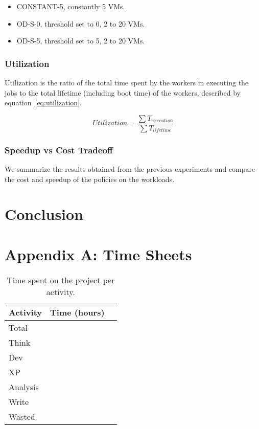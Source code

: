 \documentclass[a4paper]{IEEEtran}
\begin{document}
\begin{itemize}
  \item \textsc{CONSTANT-5}, constantly 5 VMs.
  \item \textsc{OD-S-0}, threshold set to 0, 2 to 20 VMs.
  \item \textsc{OD-S-5}, threshold set to 5, 2 to 20 VMs.
\end{itemize}

\subsubsection{Utilization}

Utilization is the ratio of the total time spent by the workers in executing the jobs to the
total lifetime (including boot time) of the workers, described by equation~\ref{eq:utilization}.

\begin{equation} \label{eq:utilization}
  Utilization = \frac{\sum T_{execution}}{\sum T_{lifetime}}
\end{equation}

\subsubsection{Speedup vs Cost Tradeoff}

We summarize the results obtained from the previous experiments and compare the cost and speedup
of the policies on the workloads.

\section{Conclusion} \label{conclusion}




\section*{Appendix A: Time Sheets}

\begin{table}[htbp]
  \centering
  \caption{Time spent on the project per activity.}
  \begin{tabular}{| l | r | r |}
    \hline
    Activity & Time (hours) \\
    \hline
    Total & \\
    Think & \\
    Dev & \\
    XP & \\
    Analysis & \\
    Write & \\
    Wasted & \\
    \hline
  \end{tabular}
\end{table}
\end{document}
